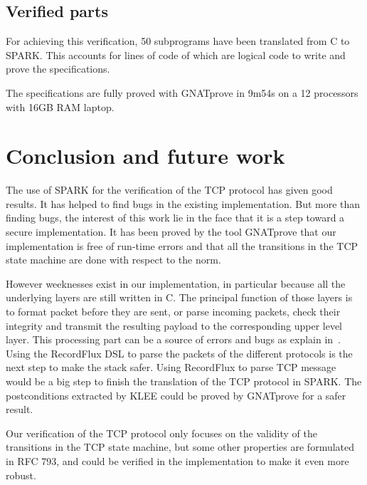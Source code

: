 \documentclass[conference]{IEEEtran}
\begin{document}
\subsection{Verified parts}

For achieving this verification, 50 subprograms have been translated from C to
SPARK. This accounts for  lines of code of which  are logical
code to write and prove the specifications.

The specifications are fully proved with GNATprove in 9m54s on a 12 processors with 16GB RAM laptop.


\section{Conclusion and future work}

The use of SPARK for the verification of the TCP protocol has given good
results. It has helped to find bugs in the existing implementation. But more
than finding bugs, the interest of this work lie in the face that it is a
step toward a secure implementation. It has been proved by the tool GNATprove
that our implementation is free of run-time errors and that all the transitions
in the TCP state machine are done with respect to the norm.

However weeknesses exist in our implementation, in particular because all the
underlying layers are still written in C. The principal function of those layers
is to format packet before they are sent, or parse incoming packets, check their
integrity and transmit the resulting payload to the corresponding upper level
layer. This processing part can be a source of errors and bugs as explain
in~\cite{Reiher2019RecordFluxFM}.
Using the RecordFlux DSL to parse the packets of the different protocols is the
next step to make the stack safer. Using RecordFlux to parse TCP message
would be a big step to finish the translation of the TCP protocol in SPARK.
The postconditions extracted by KLEE could be proved by GNATprove for a
safer result.

Our verification of the TCP protocol only focuses on the validity of the
transitions in the TCP state machine, but some other properties are formulated
in RFC 793, and could be verified in the implementation to make it even
more robust.





\end{document}
